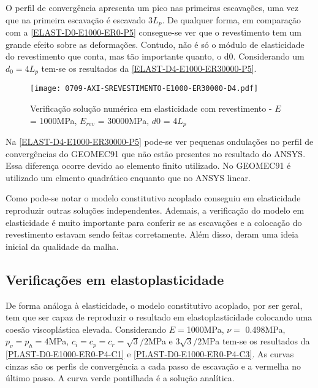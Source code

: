 O perfil de convergência apresenta um pico nas primeiras escavações, uma vez que na primeira escavação é escavado 3$L_p$. De qualquer forma, em comparação com a \autoref{ELAST-D0-E1000-ER0-P5} consegue-se ver que o revestimento tem um grande efeito sobre as deformações. Contudo, não é só o módulo de elasticidade do revestimento que conta, mas tão importante quanto, o d0. Considerando um $d_0=4L_p$ tem-se os resultados da \autoref{ELAST-D4-E1000-ER30000-P5}.

\begin{figure}[H]
	\begin{center}
		\texttt{[image: 0709-AXI-SREVESTIMENTO-E1000-ER30000-D4.pdf]}
	\end{center}
	\caption{\label{ELAST-D4-E1000-ER30000-P5}Verificação solução numérica em elasticidade com revestimento - $E$ = 1000MPa, $E_{rev}$ = 30000MPa, $d0$ = 4$L_p$}
\end{figure}

Na \autoref{ELAST-D4-E1000-ER30000-P5} pode-se ver pequenas ondulações no perfil de convergências do GEOMEC91 que não estão presentes no resultado do ANSYS. Essa diferença ocorre devido ao elemento finito utilizado. No GEOMEC91 é utilizado um elmento quadrático enquanto que no ANSYS linear.

Como pode-se notar o modelo constitutivo acoplado conseguiu em elasticidade reproduzir outras soluções independentes. Ademais, a verificação do modelo em elasticidade é muito importante para conferir se as escavações e a colocação do revestimento estavam sendo feitas corretamente. Além disso, deram uma ideia inicial da qualidade da malha.

\subsection{Verificações em elastoplasticidade}

De forma análoga à elasticidade, o modelo constitutivo acoplado, por ser geral, tem que ser capaz de reproduzir o resultado em elastoplasticidade colocando uma coesão viscoplástica elevada. Considerando $E =$1000MPa, $\nu =$ 0.498MPa, $p_v = p_h = 4$MPa, $c_i=c_p=c_r = \sqrt{3}/2$MPa e $3\sqrt{3}/2$MPa  tem-se os resultados da \autoref{PLAST-D0-E1000-ER0-P4-C1} e \autoref{PLAST-D0-E1000-ER0-P4-C3}. As curvas cinzas são os perfis de convergência a cada passo de escavação e a vermelha no último passo. A curva verde pontilhada é a solução analítica.

